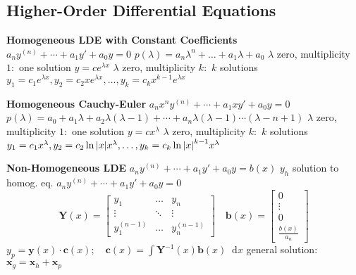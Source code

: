 \documentclass[10pt, a4paper]{article}
\newcommand*\diff{\mathop{}\!\mathrm{d}} %
\begin{document}
\begin{multicols}{2}
\vspace{-3mm}
\subsection*{Higher-Order Differential Equations}

\textbf{Homogeneous LDE with Constant Coefficients} \newline
$ a_n y^{(n)} + \cdots + a_1 y' + a_0 y = 0 $ \newline
$ p(\lambda) = a_n \lambda^n + \dots + a_1 \lambda + a_0 $ \newline
$ \lambda $ zero, multiplicity $ 1: $ one solution $ y = c e^{\lambda x} $ \newline
$ \lambda $ zero, multiplicity $ k: $ $ k $ solutions \newline
$ y_1 = c_1 e^{\lambda x}, y_{2} = c_{2} x e^{\lambda x}, \dots, y_{k} = c_{k} x^{k-1} e^{\lambda x}  $

\textbf{Homogeneous Cauchy-Euler} \newline
$ a_n x^n y^{(n)} + \cdots + a_1 x y' + a_0 y = 0 $ \newline
$ p(\lambda) = a_0 + a_1 \lambda + a_2 \lambda (\lambda - 1) + \cdots + a_n \lambda (\lambda - 1)\cdots (\lambda - n + 1) $ \newline
$ \lambda $ zero, multiplicity $ 1: $ one solution $ y = c x^{\lambda} $ \newline
$ \lambda $ zero, multiplicity $ k: $ $ k $ solutions \newline
$ y_1 = c_1 x^{\lambda }, y_{2} = c_{2} \ln\abs{x} x^{\lambda }, \dots, y_{k} = c_{k} \ln\abs{x}^{k-1} x^{\lambda}  $

\textbf{Non-Homogeneous LDE} \newline
$ a_n y^{(n)} + \cdots + a_1 y' + a_0y = b(x) $ \newline
$ y_h $ solution to homog. eq. $ a_n y^{(n)} + \cdots + a_1 y' + a_0y = 0 $ \newline \vspace{-3mm}
\[
	\mathbf{Y}(x) = 
	\begin{bmatrix}
		y_1 & \dots & y_n \\
		\vdots & \ddots & \vdots \\
		y_1^{(n-1)} & \dots & y_n^{(n-1)}
	\end{bmatrix}
	\quad 
	\bm{b}(x) = 
	\begin{bmatrix}
		0 \\
		\vdots \\
		0 \\[0.5ex]
		\frac{b(x)}{a_n}
	\end{bmatrix}
\] \vspace{-4mm} \newline 
$ y_p = \bm{y}(x) \cdot \bm{c}(x); \quad \bm{c}(x) = \int \mathbf{Y}^{-1}(x) \bm{b}(x) \diff x $ \vspace{0.5mm}\newline
general solution: $ \bm{x}_g = \bm{x}_h + \bm{x}_p $
\vspace{1mm}


\end{multicols}
\end{document}
